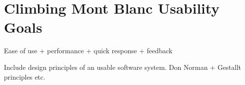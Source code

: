 \chapter{Climbing Mont Blanc Usability Goals}

Ease of use + performance + quick response + feedback

Include design principles of an usable software system. Don Norman + Gestallt principles etc.
